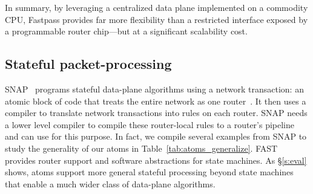 In summary, by leveraging a centralized data plane implemented on a commodity
CPU, Fastpass provides far more flexibility than a restricted interface exposed
by a programmable router chip---but at a significant scalability cost.

\subsection{Stateful packet-processing}
SNAP~\cite{snap} programs stateful data-plane algorithms using a network
transaction: an atomic block of code that treats the entire network as one
router~\cite{onebigswitch}. It then uses a compiler to translate network
transactions into rules on each router. SNAP needs a lower level compiler to
compile these router-local rules to a router's pipeline and can use
\pktlanguage for this purpose. In fact, we compile several examples from SNAP
to study the generality of our atoms in Table~\ref{tab:atoms_generalize}.
FAST~\cite{fast} provides router support and software abstractions for state
machines. As \S\ref{s:eval} shows, atoms support more general stateful
processing beyond state machines that enable a much wider class of data-plane
algorithms.

